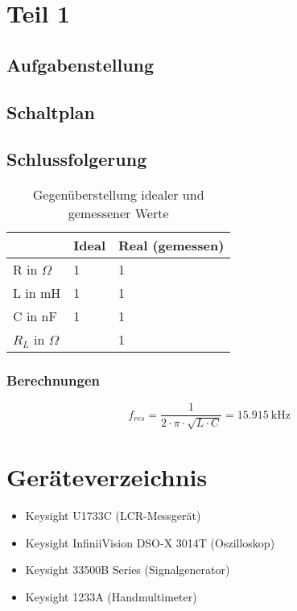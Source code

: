




\fancyhead[R]{\textbf{\nouppercase{\leftmark}}}

\section{Teil 1}
\subsection{Aufgabenstellung}
\subsection{Schaltplan}
\subsection{Schlussfolgerung}

\begin{table}
    \centering
    \begin{tabularx}{\textwidth}{|X|X|X|} \hline
         &  \textbf{Ideal}& \textbf{Real (gemessen)}\\ \hline 
         R in $\Omega$&  1& 1\\ \hline 
         L in mH&  1& 1\\ \hline 
         C in nF&  1& 1\\ \hline
         $R_L$ in $\Omega$& &1\\\hline
    \end{tabularx}
    \caption{Gegenüberstellung idealer und gemessener Werte}
\end{table}

\subsubsection{Berechnungen}
$$f_{res} = \frac{1}{2 \cdot \pi \cdot \sqrt{L \cdot C}} = \SI{15,915}{\kilo \Hz}$$

\newpage

\section{Geräteverzeichnis}

\begin{itemize}
    \item Keysight U1733C (LCR-Messgerät)
    \item Keysight InfiniiVision DSO-X 3014T (Oszilloskop)
    \item Keysight 33500B Series (Signalgenerator)
    \item Keysight 1233A (Handmultimeter)
\end{itemize}



